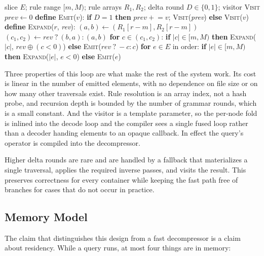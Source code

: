 \begin{algorithm}[t]
\small
\caption{Streaming traversal expansion}
\label{alg:stream}
\begin{algorithmic}[1]
  \REQUIRE slice $E$; rule range $[m,M)$; rule arrays $R_1,R_2$;
           delta round $D\in\{0,1\}$; visitor \textsc{Visit}
  \STATE $\textit{prev}\gets 0$
  \STATE \textbf{define} \textsc{Emit}($v$):
         \textbf{if} $D{=}1$ \textbf{then} $\textit{prev}\mathrel{+}=v$;
         \textsc{Visit}(\textit{prev}) \textbf{else} \textsc{Visit}($v$)
  \STATE \textbf{define} \textsc{Expand}($r$, \textit{rev}):
  \STATE \quad $(a,b)\gets(R_1[r{-}m],R_2[r{-}m])$
  \STATE \quad $(c_1,c_2)\gets \textit{rev}\ ?\ (b,a):(a,b)$
  \STATE \quad \textbf{for} $c \in (c_1,c_2)$:
  \STATE \qquad \textbf{if} $|c|\in[m,M)$ \textbf{then}
         \textsc{Expand}($|c|$, $\textit{rev}\oplus(c{<}0)$)
  \STATE \qquad \textbf{else} \textsc{Emit}($\textit{rev}\ ?\ {-}c:c$)
  \STATE \textbf{for} $e \in E$ in order:
  \STATE \quad \textbf{if} $|e|\in[m,M)$ \textbf{then} \textsc{Expand}($|e|$, $e{<}0$)
         \textbf{else} \textsc{Emit}($e$)
\end{algorithmic}
\end{algorithm}

Three properties of this loop are what make the rest of the system work. Its cost
is linear in the number of emitted elements, with no dependence on file size or on
how many other traversals exist. Rule resolution is an array index, not a hash
probe, and recursion depth is bounded by the number of grammar rounds, which is a
small constant. And the visitor is a template parameter, so the per-node fold is
inlined into the decode loop and the compiler sees a single fused loop rather than
a decoder handing elements to an opaque callback. In effect the query's operator
is compiled into the decompressor.

Higher delta rounds are rare and are handled by a fallback that materializes a
single traversal, applies the required inverse passes, and visits the result. This
preserves correctness for every container while keeping the fast path free of
branches for cases that do not occur in practice.

\subsection{Memory Model}
\label{subsec:eng-memory}

The claim that distinguishes this design from a fast decompressor is a claim about
residency. While a query runs, at most four things are in memory:

